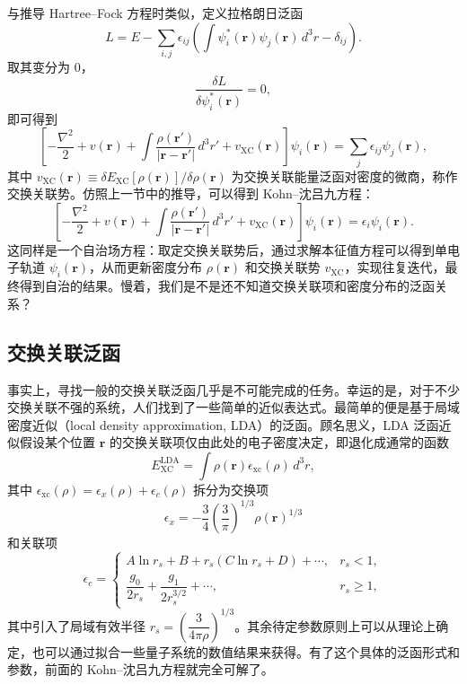 与推导 Hartree--Fock 方程时类似，定义拉格朗日泛函
\begin{equation}
 L=E-\sum_{i,j}\epsilon_{ij}\left(\int\psi_i^*(\bm r)\psi_j(\bm r)\,d^3r-\delta_{ij}\right).
\tag{6.5.8}
\end{equation}
取其变分为 0，
\begin{equation}
 \frac{\delta L}{\delta\psi_i^*(\bm r)}=0,
\tag{6.5.9}
\end{equation}
即可得到
\begin{equation}
 \left[-\frac{\nabla^2}{2}+v(\bm r)+\int\frac{\rho(\bm r')}{|\bm r-\bm r'|}\,d^3r'+v_{\mathrm{XC}}(\bm r)\right]\psi_i(\bm r)
 =\sum_j\epsilon_{ij}\psi_j(\bm r),
\tag{6.5.10}
\end{equation}
其中 $v_{\mathrm{XC}}(\bm r)\equiv\delta E_{\mathrm{XC}}[\rho(\bm r)]/\delta\rho(\bm r)$ 为交换关联能量泛函对密度的微商，称作交换关联势。仿照上一节中的推导，可以得到 Kohn--沈吕九方程：
\begin{equation}
 \left[-\frac{\nabla^2}{2}+v(\bm r)+\int\frac{\rho(\bm r')}{|\bm r-\bm r'|}\,d^3r'+v_{\mathrm{XC}}(\bm r)\right]\psi_i(\bm r)
 =\epsilon_i\psi_i(\bm r).
\tag{6.5.11}
\end{equation}
这同样是一个自治场方程：取定交换关联势后，通过求解本征值方程可以得到单电子轨道 $\psi_i(\bm r)$，从而更新密度分布 $\rho(\bm r)$ 和交换关联势 $v_{\mathrm{XC}}$，实现往复迭代，最终得到自治的结果。慢着，我们是不是还不知道交换关联项和密度分布的泛函关系？

\subsection{交换关联泛函}

事实上，寻找一般的交换关联泛函几乎是不可能完成的任务。幸运的是，对于不少交换关联不强的系统，人们找到了一些简单的近似表达式。最简单的便是基于局域密度近似（local density approximation, LDA）的泛函。顾名思义，LDA 泛函近似假设某个位置 $\bm r$ 的交换关联项仅由此处的电子密度决定，即退化成通常的函数
\begin{equation}
 E_{\mathrm{XC}}^{\mathrm{LDA}}=\int\rho(\bm r)\epsilon_{\mathrm{xc}}(\rho)\,d^3r,
\tag{6.5.12}
\end{equation}
其中 $\epsilon_{\mathrm{xc}}(\rho)=\epsilon_x(\rho)+\epsilon_c(\rho)$ 拆分为交换项
\begin{equation}
 \epsilon_x=-\frac34\left(\frac3\pi\right)^{1/3}\rho(\bm r)^{1/3}
\tag{6.5.13}
\end{equation}
和关联项
\begin{equation}
 \epsilon_c=
 \begin{cases}
 A\ln r_s+B+r_s(C\ln r_s+D)+\cdots, & r_s<1,\\[2mm]
 \dfrac{g_0}{2r_s}+\dfrac{g_1}{2r_s^{3/2}}+\cdots, & r_s\ge1,
 \end{cases}
\tag{6.5.14}
\end{equation}
其中引入了局域有效半径 $r_s=\left(\dfrac3{4\pi\rho}\right)^{1/3}$。其余待定参数原则上可以从理论上确定，也可以通过拟合一些量子系统的数值结果来获得。有了这个具体的泛函形式和参数，前面的 Kohn--沈吕九方程就完全可解了。


